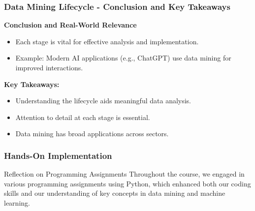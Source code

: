 \documentclass[aspectratio=169]{beamer}
\begin{document}
\begin{frame}[fragile]
    \frametitle{Data Mining Lifecycle - Conclusion and Key Takeaways}
    
    \textbf{Conclusion and Real-World Relevance}
    
    \begin{itemize}
        \item Each stage is vital for effective analysis and implementation.
        \item Example: Modern AI applications (e.g., ChatGPT) use data mining for improved interactions.
    \end{itemize}

    \textbf{Key Takeaways:}
    \begin{itemize}
        \item Understanding the lifecycle aids meaningful data analysis.
        \item Attention to detail at each stage is essential.
        \item Data mining has broad applications across sectors.
    \end{itemize}
\end{frame}

\begin{frame}
    \frametitle{Hands-On Implementation}
    \begin{block}{Reflection on Programming Assignments}
        Throughout the course, we engaged in various programming assignments using Python, which enhanced both our coding skills and our understanding of key concepts in data mining and machine learning.
    \end{block}
\end{frame}
\end{document}
